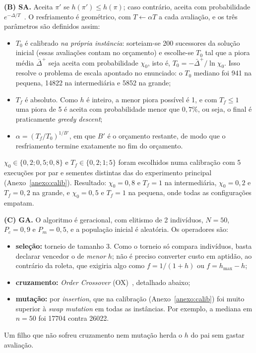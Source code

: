 \textbf{(B) SA.} Aceita $\pi'$ se $h(\pi')\le h(\pi)$; caso contrário, aceita
com probabilidade $e^{-\Delta/T}$~\cite{poole2023}. O resfriamento é geométrico, com
$T\leftarrow\alpha T$ a cada avaliação, e os três parâmetros são definidos
assim:
\begin{itemize}
    \item \textbf{$T_0$} é calibrado \emph{na própria instância}: sorteiam-se
    200 sucessores da solução inicial (essas avaliações contam no orçamento) e
    escolhe-se $T_0$ tal que a piora média $\bar\Delta^+$ seja aceita com
    probabilidade $\chi_0$, isto é, $T_0=-\bar\Delta^+/\ln\chi_0$. Isso resolve
    o problema de escala apontado no enunciado: o $T_0$ mediano foi 941 na
    pequena, \num{14822} na intermediária e \num{5852} na grande;
    \item \textbf{$T_f$} é absoluto. Como $h$ é inteiro, a menor piora possível
    é 1, e com $T_f\le1$ uma piora de 5 é aceita com probabilidade menor que
    $0{,}7\%$, ou seja, o final é praticamente \textit{greedy descent};
    \item \textbf{$\alpha=(T_f/T_0)^{1/B'}$}, em que $B'$ é o orçamento
    restante, de modo que o resfriamento termine exatamente no fim do
    orçamento.
\end{itemize}
$\chi_0\in\{0{,}2;0{,}5;0{,}8\}$ e $T_f\in\{0{,}2;1;5\}$ foram escolhidos numa
calibração com 5 execuções por par e sementes distintas das do experimento
principal (Anexo~\ref{anexo:calib}). Resultado: $\chi_0=0{,}8$ e $T_f=1$ na
intermediária, $\chi_0=0{,}2$ e $T_f=0{,}2$ na grande, e $\chi_0=0{,}5$ e $T_f=1$
na pequena, onde todas as configurações empatam.

\textbf{(C) GA.} O algoritmo é geracional, com elitismo de 2 indivíduos,
$N=50$, $P_c=0{,}9$ e $P_m=0{,}5$, e a população inicial é aleatória. Os
operadores são:
\begin{itemize}
    \item \textbf{seleção:} torneio de tamanho 3. Como o torneio só compara
    indivíduos, basta declarar vencedor o de \emph{menor} $h$; não é preciso
    converter custo em aptidão, ao contrário da roleta, que exigiria algo como
    $f=1/(1+h)$ ou $f=h_{\max}-h$;
    \item \textbf{cruzamento:} \textit{Order Crossover} (OX)~\cite{eiben2003,gaspar2013}, detalhado abaixo;
    \item \textbf{mutação:} por \textit{insertion}, que na calibração
    (Anexo~\ref{anexo:calib}) foi muito superior à \textit{swap mutation} em
    todas as instâncias. Por exemplo, a mediana em $n=50$ foi \num{17704}
    contra \num{26022}.
\end{itemize}
Um filho que não sofreu cruzamento nem mutação herda o $h$ do pai sem gastar
avaliação.

